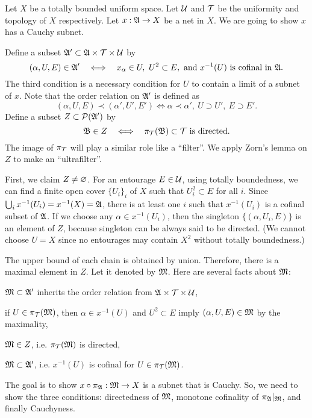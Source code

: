 \documentclass{../exp}
\begin{document}
\begin{pf}[1 of Theorem 1.1]
Let $X$ be a totally bounded uniform space.
Let $\mathcal{U}$ and $\mathcal{T}$ be the uniformity and topology of $X$ respectively.
Let $x:\fA\to X$ be a net in $X$.
We are going to show $x$ has a Cauchy subnet.


Define a subset $\mathfrak{A}'\subset\mathfrak{A}\times\mathcal{T}\times\mathcal{U}$ by
\[(\alpha,U,E)\in\fA'\iff x_\alpha\in U,\ U^2\subset E,\text{ and }x^{-1}(U)\text{ is cofinal in }\fA.\]
The third condition is a necessary condition for $U$ to contain a limit of a subnet of $x$.
Note that the order relation on $\mathfrak{A}'$ is defined as
\[(\alpha,U,E)\prec(\alpha',U',E')\iff \alpha\prec\alpha',\ U\supset U',\ E\supset E'.\]
Define a subset $Z\subset\mathcal{P}(\mathfrak{A}')$ by
\[\fB\in Z\iff \pi_\cT(\fB)\subset\cT\text{ is directed}.\]
The image of $\pi_{\mathcal{T}}$ will play a similar role like a ``filter''.
We apply Zorn's lemma on $Z$ to make an ``ultrafilter''.

First, we claim $Z\ne\varnothing$.
For an entourage $E\in\mathcal{U}$, using totally boundedness, we can find a finite open cover $\{U_i\}_i$ of $X$ such that $U_i^2\subset E$ for all $i$.
Since $\bigcup_ix^{-1}(U_i)=x^{-1}(X)=\mathfrak{A}$, there is at least one $i$ such that $x^{-1}(U_i)$ is a cofinal subset of $\mathfrak{A}$.
If we choose any $\alpha\in x^{-1}(U_i)$, then the singleton $\{(\alpha,U_i,E)\}$ is an element of $Z$, because singleton can be always said to be directed.
(We cannot choose $U=X$ since no entourages may contain $X^2$ without totally boundedness.)

The upper bound of each chain is obtained by union.
Therefore, there is a maximal element in $Z$.
Let it denoted by $\mathfrak{M}$.
Here are several facts about $\mathfrak{M}$:
\begin{cond}
\item $\mathfrak{M}\subset\mathfrak{A}'$ inherits the order relation from $\mathfrak{A}\times\mathcal{T}\times\mathcal{U}$,
\item if $U\in\pi_{\mathcal{T}}(\mathfrak{M})$, then $\alpha\in x^{-1}(U)$ and $U^2\subset E$ imply $(\alpha,U,E)\in\mathfrak{M}$ by the maximality,
\item $\mathfrak{M}\in Z$, i.e. $\pi_{\mathcal{T}}(\mathfrak{M})$ is directed,
\item $\mathfrak{M}\subset\mathfrak{A}'$, i.e. $x^{-1}(U)$ is cofinal for $U\in\pi_{\mathcal{T}}(\mathfrak{M})$.
\end{cond}


The goal is to show $x\o\pi_\fA:\fM\to X$ is a subnet that is Cauchy.
So, we need to show the three conditions: directedness of $\mathfrak{M}$, monotone cofinality of $\pi_{\mathfrak{A}}|_{\mathfrak{M}}$, and finally Cauchyness.


\end{pf}
\end{document}
